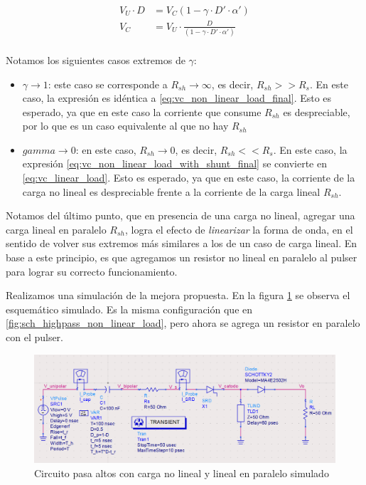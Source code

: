 \begin{equation}
    \label{eq:vc_non_linear_load_with_shunt_final}
    \begin{aligned}
        V_U \cdot D &= V_C \left( 1 - \gamma \cdot D' \cdot \alpha'\right) \\
        V_C &= V_U \cdot \frac{D}{\left( 1 - \gamma \cdot D' \cdot \alpha'\right)} \\
    \end{aligned}
\end{equation}

Notamos los siguientes casos extremos de $\gamma$:

\begin{itemize}
    \item $\gamma \to 1$: este caso se corresponde a $R_{sh} \to \infty$, es
        decir, $R_{sh} >> R_s$. En este caso, la expresión es idéntica a
        \ref{eq:vc_non_linear_load_final}. Esto es esperado, ya que en este caso
        la corriente que consume $R_{sh}$ es despreciable, por lo que es un caso
        equivalente al que no hay $R_{sh}$
    \item $gamma \to 0$: en este caso, $R_{sh} \to 0$, es decir, $R_{sh} <<
        R_s$. En este caso, la expresión
        \ref{eq:vc_non_linear_load_with_shunt_final} se convierte en
        \ref{eq:vc_linear_load}. Esto es esperado, ya que en este caso, la
        corriente de la carga no lineal es despreciable frente a la corriente
        de la carga lineal $R_{sh}$.
\end{itemize}

Notamos del último punto, que en presencia de una carga no lineal, agregar una
carga lineal en paralelo $R_{sh}$, logra el efecto de \textit{linearizar} la
forma de onda, en el sentido de volver sus extremos más similares a los de un
caso de carga lineal.  En base a este principio, es que agregamos un resistor no
lineal en paralelo al pulser para lograr su correcto funcionamiento.

Realizamos una simulación de la mejora propuesta. En la figura
\ref{fig:sch_highpass_non_linear_w_shunt_simulation} se observa el esquemático
simulado. Es la misma configuración que en
\ref{fig:sch_highpass_non_linear_load}, pero ahora se  agrega un resistor en
paralelo con el pulser.

\begin{figure}[tbp]
    \centering
    \includegraphics[width=\textwidth]{images/highpass_nonlinear_w_shunt_sch.png}
    \caption{Circuito pasa altos con carga no lineal y lineal en paralelo simulado}
    \label{fig:sch_highpass_non_linear_w_shunt_simulation}
\end{figure}

